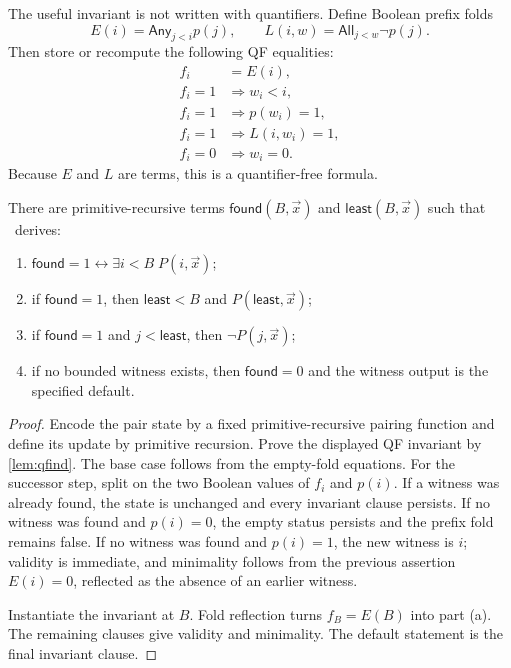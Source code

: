 The useful invariant is not written with quantifiers.  Define Boolean prefix folds
\[
 E(i)=\mathsf{Any}_{j<i}p(j),
 \qquad
 L(i,w)=\mathsf{All}_{j<w}\neg p(j).
\]
Then store or recompute the following QF equalities:
\begin{align*}
 f_i&=E(i),\\
 f_i=1&\Rightarrow w_i<i,\\
 f_i=1&\Rightarrow p(w_i)=1,\\
 f_i=1&\Rightarrow L(i,w_i)=1,\\
 f_i=0&\Rightarrow w_i=0.
\end{align*}
Because \(E\) and \(L\) are terms, this is a quantifier-free formula.

\begin{theorem}\label{thm:least-search}
There are primitive-recursive terms \(\mathsf{found}(B,\vec x)\) and \(\mathsf{least}(B,\vec x)\) such that \iPRA\ derives:
\begin{enumerate}[label=(\alph*)]
  \item \(\mathsf{found}=1\leftrightarrow\exists i<B\;P(i,\vec x)\);
  \item if \(\mathsf{found}=1\), then \(\mathsf{least}<B\) and \(P(\mathsf{least},\vec x)\);
  \item if \(\mathsf{found}=1\) and \(j<\mathsf{least}\), then \(\neg P(j,\vec x)\);
  \item if no bounded witness exists, then \(\mathsf{found}=0\) and the witness output is the specified default.
\end{enumerate}
\end{theorem}

\begin{proof}
Encode the pair state by a fixed primitive-recursive pairing function and define its update by primitive recursion.  Prove the displayed QF invariant by \cref{lem:qfind}.  The base case follows from the empty-fold equations.  For the successor step, split on the two Boolean values of \(f_i\) and \(p(i)\).  If a witness was already found, the state is unchanged and every invariant clause persists.  If no witness was found and \(p(i)=0\), the empty status persists and the prefix fold remains false.  If no witness was found and \(p(i)=1\), the new witness is \(i\); validity is immediate, and minimality follows from the previous assertion \(E(i)=0\), reflected as the absence of an earlier witness.

Instantiate the invariant at \(B\).  Fold reflection turns \(f_B=E(B)\) into part (a).  The remaining clauses give validity and minimality.  The default statement is the final invariant clause.
\end{proof}


